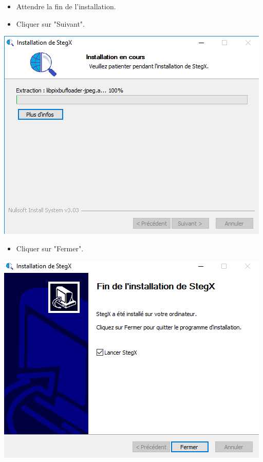 \documentclass[11pt]{article}
\begin{document}
\begin{itemize}
\item Attendre la fin de l'installation.
\item Cliquer sur "Suivant". 
\end{itemize}

\hspace{2.5cm}
\includegraphics[scale=0.8]{pictures/installation.png}
\vspace{1cm}
\newpage

\begin{itemize}
\item Cliquer sur "Fermer". 
\end{itemize}

\hspace{1cm}
\includegraphics[scale=1]{pictures/fin.png}
\vspace{1cm}
\end{document}
